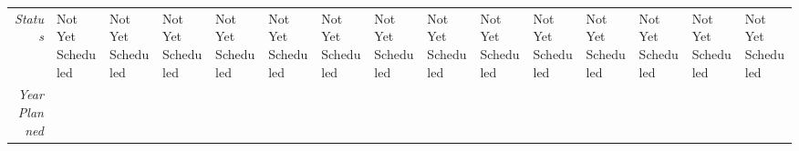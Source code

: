 \begin{tabularx}{\textwidth}{r|X|X|X|X|X|X|X|X|X|X|X|X|X|X|}
    \multicolumn{1}{|r|}{\cellcolor{ccorangelight}\textit{Status}}                & Not Yet Scheduled                                                         & Not Yet Scheduled                                                         & Not Yet Scheduled                                                         & Not Yet Scheduled                                                         & Not Yet Scheduled                                                         & Not Yet Scheduled                                                         & Not Yet Scheduled                                                         & Not Yet Scheduled                                                         & Not Yet Scheduled                                                         & Not Yet Scheduled                                                         & Not Yet Scheduled                                                         & Not Yet Scheduled                                                         & Not Yet Scheduled                                                         & Not Yet Scheduled                                                         \\
    \multicolumn{1}{|r|}{\cellcolor{ccorangelight}\textit{Year Planned}}                  &                                                      &                                                      &                                                      &                                                      &                                                      &                                                      &                                                      &                                                      &                                                      &                                                      &                                                      &                                                      &                                                      &                                                      \\ \hline
\end{tabularx}